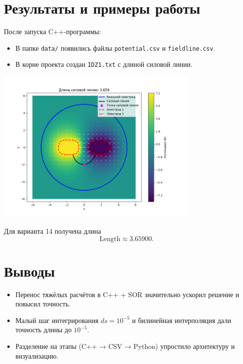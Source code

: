 \documentclass[12pt]{article}
\begin{document}
\section*{Результаты и примеры работы}
После запуска C++-программы:
\begin{itemize}
  \item В папке \texttt{data/} появились файлы \texttt{potential.csv} и \texttt{fieldline.csv}.
  \item В корне проекта создан \texttt{IDZ1.txt} с длиной силовой линии.
\end{itemize}
\begin{center}
  \includegraphics[width=0.75\textwidth]{pictures/result.png}
\end{center}
Для варианта 14 получена длина
\[
\text{Length} \approx 3.65900.
\]

\section*{Выводы}
\begin{itemize}
  \item Перенос тяжёлых расчётов в C++ + SOR значительно ускорил решение и повысил точность.
  \item Малый шаг интегрирования \(ds=10^{-5}\) и билинейная интерполяция дали точность длины до \(10^{-5}\).
  \item Разделение на этапы (C++ → CSV → Python) упростило архитектуру и визуализацию.
\end{itemize}
\end{document}
